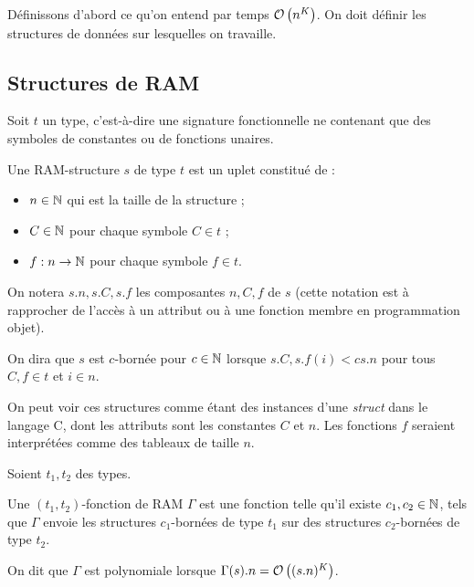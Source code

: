 	Définissons d'abord ce qu'on entend par temps $\mathcal{O}\left( n^K \right)$. On doit définir les structures de données sur lesquelles on travaille. 
		
		\subsection{Structures de RAM} %
		\label{sec:RAM_data_structures}
		
		\begin{definition}
			\label{def:RAM_data_structures}
			Soit $t$ un type, c'est-à-dire une signature fonctionnelle ne contenant que des symboles de constantes ou de fonctions unaires.
			
			Une RAM-structure $s$ de type $t$ est un uplet constitué de :
			\begin{itemize}[itemsep=-1mm]
				\item 	$n \in \mathbb{N}$ qui est la taille de la structure ;
				\item 	$C \in \mathbb{N}$ pour chaque symbole $C \in t$ ;
				\item 	$f : n \to \mathbb{N}$ pour chaque symbole $f \in t$.
			\end{itemize}
			
			On notera $s.n, s.C, s.f$ les composantes $n, C, f$ de $s$ (cette notation est à rapprocher de l'accès à un attribut ou à une fonction membre en programmation objet).
			
			On dira que $s$ est $c$-bornée pour $c\in\mathbb{N}$ lorsque $s.C, s.f(i) < c s.n$ pour tous $C, f \in t$ et $i \in n$.
		\end{definition}
		
		On peut voir ces structures comme étant des instances d'une \emph{struct} dans le langage C, dont les attributs sont les constantes $C$ et $n$. Les fonctions $f$ seraient interprétées comme des tableaux de taille $n$. 
		
		
		\begin{definition}
			\label{def:fonction_de_RAM}
			Soient $t_1, t_2$ des types. 
			
			Une $(t_1, t_2)$-fonction de RAM $\Gamma$ est une fonction telle qu'il existe $c_1, c_2 \in \mathbb{N}$, tels que $\Gamma$ envoie les structures $c_1$-bornées de type $t_1$ sur des structures $c_2$-bornées \footnotemark de type $t_2$.
			
			
			On dit que $\Gamma$ est polynomiale lorsque $\Gamma(s).n = \mathcal{O}\left( (s.n)^K \right)$.
			
		\end{definition}
		
